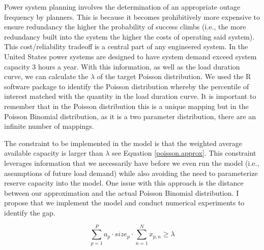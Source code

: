 \documentclass[10pt]{amsart}
\begin{document}
Power system planning involves the determination of an appropriate outage frequency by planners.
This is because it becomes prohibitively more expensive to ensure redundancy the higher the probability of success climbs (i.e., the more redundancy built into the system the higher the costs of operating said system).
This cost/reliability tradeoff is a central part of any engineered system.
In the United States power systems are designed to have system demand exceed system capacity 3 hours a year.
With this information, as well as the load duration curve, we can calculate the $\lambda$ of the target Poisson distribution.
We used the R software package to identify the Poisson distribution whereby the percentile of interest matched with the quantity in the load duration curve.
It is important to remember that in the Poisson distribution this is a unique mapping but in the Poisson Binomial distribution, as it is a two parameter distribution, there are an infinite number of mappings.

The constraint to be implemented in the model is that the weighted average available capacity is larger than $\lambda$ see Equation \ref{poisson.approx}.
This constraint leverages information that we necessarily have before we even run the model (i.e., assumptions of future load demand) while also avoiding the need to parameterize reserve capacity into the model. 
One issue with this approach is the distance between our approximation and the actual Poisson Binomial distribution.
I propose that we implement the model and conduct numerical experiments to identify the gap.

\begin{equation}\label{poisson.approx}
\sum_{p=1}^{P} a_{p} \cdot size_{p} \cdot \sum_{n=1}^{N} x_{p,n} \geq \lambda
\end{equation}
\end{document}
